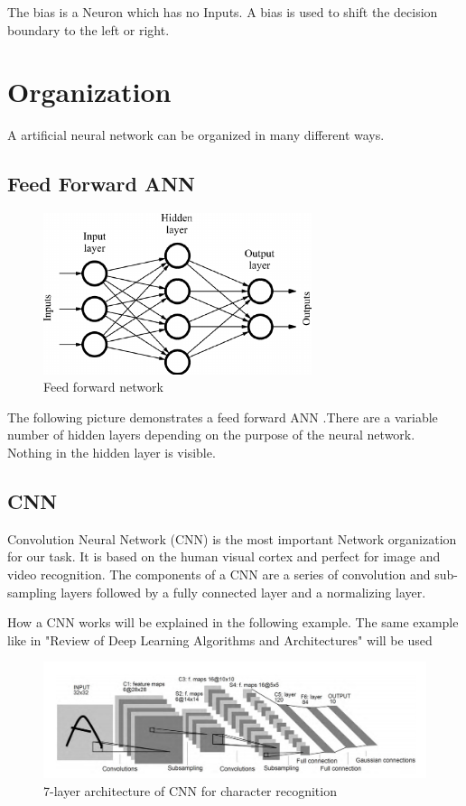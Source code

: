 The bias is a Neuron which has no Inputs. A bias is used to shift the decision boundary to the left or right.

\section{Organization}

A artificial neural network can be organized in many different ways.

\subsection{Feed Forward ANN}

\begin{figure}[h]
	\centering
	\includegraphics[width=0.7\textwidth]{./media/images/feed_forward_neural_network.png}
  	\caption{Feed forward network}
  	\label{ffNN}
\end{figure}

The following picture demonstrates a feed forward ANN .There are a variable number of hidden layers depending on the purpose of the neural network. Nothing in the hidden layer is visible. 

\subsection{CNN}

Convolution Neural Network (CNN) is the most important Network organization for our task. It is based on the human visual cortex and perfect for image and video recognition. The components of a CNN are a series of convolution and sub-sampling layers followed by a fully connected layer and a normalizing layer.

How a CNN works will be explained in the following example. The same example like in "Review of Deep Learning Algorithms and Architectures"\cite{networks,exampleCNN} will be used
\begin{figure}[h]
	\centering
	\includegraphics[width=1.1\textwidth]{./media/images/CNN.PNG}
  	\caption{7-layer architecture of CNN for character recognition
  	\\ \cite[Fig.~4.]{networks,exampleCNN}}
  	\label{CNN}
\end{figure}

